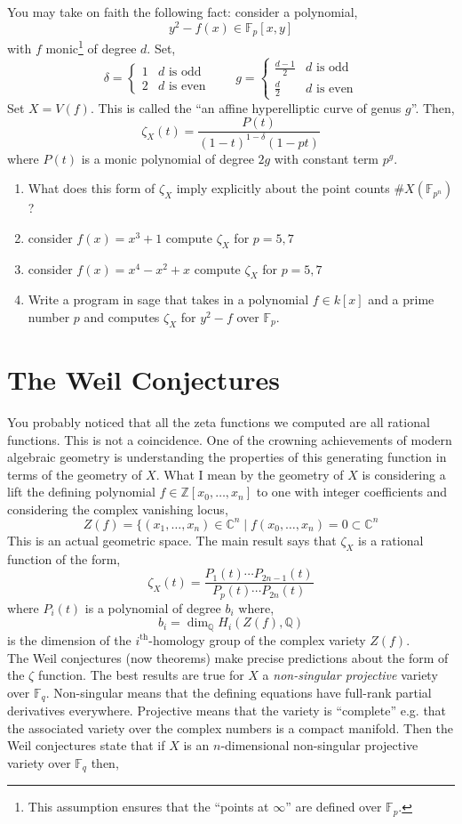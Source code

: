 \documentclass[12pt]{article}
\newcommand{\ZZ}{\mathbb{Z}}
\newcommand{\QQ}{\mathbb{Q}}
\newcommand{\FF}{\mathbb{F}}
\newcommand{\CC}{\mathbb{C}}
\theoremstyle{remark}
\theoremstyle{definition}
\begin{document}
You may take on faith the following fact: consider a polynomial,
\[ y^2 - f(x) \in \FF_p[x,y] \]
with $f$ monic\footnote{This assumption ensures that the ``points at $\infty$'' are defined over $\FF_p$.} of degree $d$. Set,
\[ \delta = 
\begin{cases}
1 & d \text{ is odd}
\\
2 & d \text{ is even}
\end{cases} 
\quad \quad
g = 
\begin{cases}
\frac{d-1}{2} & d \text{ is odd}
\\
\frac{d}{2} & d \text{ is even}
\end{cases} \]
Set $X = V(f)$. This is called the ``an affine hyperelliptic curve of genus $g$''. Then,
\[ \zeta_{X}(t) = \frac{P(t)}{(1 - t)^{1-\delta} (1 - p t)} \]
where $P(t)$ is a monic polynomial of degree $2g$ with constant term $p^g$. 
\begin{enumerate}
\item What does this form of $\zeta_{X}$ imply explicitly about the point counts $\# X(\FF_{p^n})$?
\item consider $f(x) = x^3 + 1$ compute $\zeta_X$ for $p = 5,7$
\item consider $f(x) = x^4 - x^2 + x$ compute $\zeta_X$ for $p = 5,7$
\item Write a program in sage that takes in a polynomial $f \in k[x]$ and a prime number $p$ and computes $\zeta_X$ for $y^2 - f$ over $\FF_p$.
\end{enumerate}


\section{The Weil Conjectures}

You probably noticed that all the zeta functions we computed are all rational functions. This is not a coincidence. One of the crowning achievements of modern algebraic geometry is understanding the properties of this generating function in terms of the geometry of $X$. What I mean by the geometry of $X$ is considering a lift the defining polynomial $f \in \ZZ[x_0, \dots, x_n]$ to one with integer coefficients and considering the complex vanishing locus,
\[ Z(f) = \{ (x_1, \dots, x_n) \in \CC^{n} \mid f(x_0, \dots, x_n) = 0 \subset \CC^{n} \]
This is an actual geometric space. The main result says that $\zeta_X$ is a rational function of the form,
\[ \zeta_X(t) = \frac{P_1(t) \cdots P_{2n-1}(t)}{P_p(t) \cdots P_{2n}(t)} \]
where $P_i(t)$ is a polynomial of degree $b_i$ where,
\[ b_i = \dim_{\QQ} H_i(Z(f), \QQ) \]
is the dimension of the $i^{\text{th}}$-homology group of the complex variety $Z(f)$.
\\
The Weil conjectures (now theorems) make precise predictions about the form of the $\zeta$ function. The best results are true for $X$ a \textit{non-singular projective} variety over $\FF_q$. Non-singular means that the defining equations have full-rank partial derivatives everywhere. Projective means that the variety is ``complete'' e.g. that the associated variety over the complex numbers is a compact manifold. Then the Weil conjectures state that if $X$ is an $n$-dimensional non-singular projective variety over $\FF_q$ then,
\end{document}
